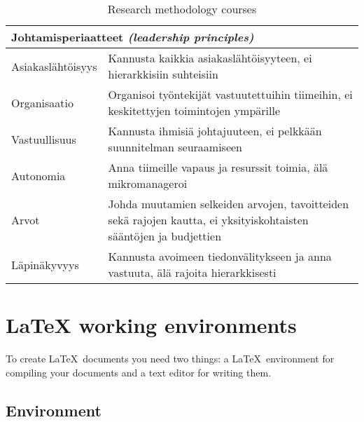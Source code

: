 \documentclass[12pt,a4paper,oneside,pdftex]{report}
\begin{document}
\begin{table}
\begin{tabular}{|p{3cm}|p{10cm}|}

\hline  %
\multicolumn{2}{|p{13cm}|}{\textbf{Johtamisperiaatteet} \emph{(leadership principles)}} \\
\hline
\raggedleft Asiakaslähtöisyys & Kannusta kaikkia asiakaslähtöisyyteen, ei hierarkkisiin suhteisiin \\
\hline
\raggedleft Organisaatio & Organisoi työntekijät vastuutettuihin tiimeihin, ei keskitettyjen toimintojen ympärille \\
\hline
\raggedleft Vastuullisuus & Kannusta ihmisiä johtajuuteen, ei pelkkään suunnitelman seuraamiseen \\
\hline
\raggedleft Autonomia & Anna tiimeille vapaus ja resurssit toimia, älä mikromanageroi \\
\hline
\raggedleft Arvot & Johda muutamien selkeiden arvojen, tavoitteiden sekä rajojen kautta, ei yksityiskohtaisten sääntöjen ja budjettien \\
\hline
\raggedleft Läpinäkyvyys & Kannusta avoimeen tiedonvälitykseen ja anna vastuuta, älä rajoita hierarkkisesti \\
\hline
\end{tabular} %
\caption{Research methodology courses}
\label{table:courses}
\end{table} %

\section{LaTeX working environments}
\label{sec:environments}

To create \LaTeX\ documents you need two things: a \LaTeX\ environment for
compiling your documents and a text editor for writing them.

\subsection{Environment}
\end{document}
